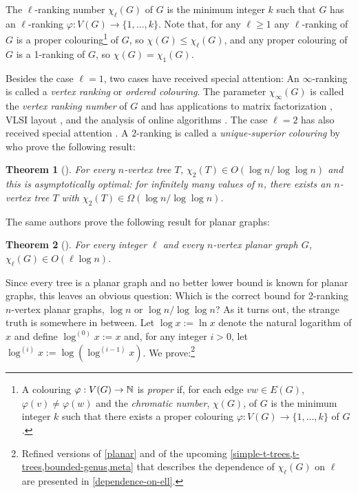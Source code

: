 \documentclass[kpfonts]{patmorin}
\newcommand{\trn}{\chi_2}
\newcommand{\lrn}{\chi_{\ell}}
\newtheorem{othertheorem}{Theorem}
\theoremstyle{named}
\begin{document}
The $\ell$-ranking number $\lrn(G)$ of $G$ is the minimum integer $k$ such that $G$ has an $\ell$-ranking $\varphi:V(G)\to \{1,\ldots,k\}$.  Note that, for any $\ell\ge 1$ any $\ell$-ranking of $G$ is a proper colouring\footnote{A colouring $\varphi:V(G)\to \mathbb{N}$ is \emph{proper} if, for each edge $vw\in E(G)$, $\varphi(v)\neq\varphi(w)$ and the \emph{chromatic number}, $\chi(G)$, of $G$ is the minimum integer $k$ such that there exists a proper colouring $\varphi:V(G)\to\{1,\ldots,k\}$ of $G$.} of $G$, so $\chi(G)\le \lrn(G)$, and any proper colouring of $G$ is a 1-ranking of $G$, so $\chi(G)=\chi_1(G)$.

Besides the case $\ell=1$, two cases have received special attention: An $\infty$-ranking is called a \emph{vertex ranking} or \emph{ordered colouring}. The parameter $\chi_\infty(G)$ is called the \emph{vertex ranking number} of $G$ and has applications to matrix factorization \cite{bodlaender.gilbert.ea:approximating,duff.reid:multifrontal,liu:role,dereniowski.kubale:cholesky}, VLSI layout \cite{leiserson:area,sen.deng.ea:on}, and the analysis of online algorithms \cite{even.smorodinsky:hitting}. The case $\ell=2$ has also received special attention \cite{almeter.demircan.ea:graph,karpas.neiman.ea:on,shalu.antony:complexity}. A $2$-ranking is called a \emph{unique-superior colouring} by \citet{karpas.neiman.ea:on} who prove the following result:

\setcounter{othertheorem}{19}
\begin{othertheorem}[\cite{karpas.neiman.ea:on}]\label{trees}
    For every $n$-vertex tree $T$, $\trn(T)\in O(\log n/\log\log n)$ and this is asymptotically optimal: for infinitely many values of $n$, there exists an $n$-vertex tree $T$ with $\trn(T)\in\Omega(\log n/\log\log n)$.
\end{othertheorem}

The same authors prove the following result for planar graphs:

\setcounter{othertheorem}{15}
\begin{othertheorem}[\cite{karpas.neiman.ea:on}]\label{planar-graphs}
    For every integer $\ell$ and every $n$-vertex planar graph $G$, $\lrn(G)\in O(\ell\log n)$.
\end{othertheorem}

Since every tree is a planar graph and no better lower bound is known for planar graphs, this leaves an obvious question:  Which is the correct bound for 2-ranking $n$-vertex planar graphs, $\log n$ or $\log n/\log\log n$?  As it turns out, the strange truth is somewhere in between.  Let $\log x :=\ln x$ denote the natural logarithm of $x$ and define $\log^{(0)}x:=x$ and, for any integer $i>0$, let $\log^{(i)}x:=\log(\log^{(i-1)} x)$. We prove:\footnote{Refined versions of \cref{planar} and of the upcoming \cref{simple-t-trees,t-trees,bounded-genus,meta} that describes the dependence of $\lrn(G)$ on $\ell$ are presented in \cref{dependence-on-ell}.}
\end{document}
